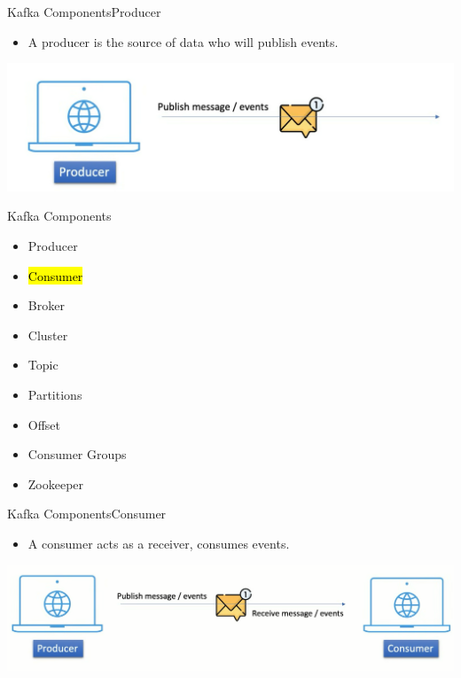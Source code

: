 \documentclass{beamer}
\begin{document}
\begin{frame}{Kafka Components}{Producer}
  \begin{itemize}
    \item A producer is the source of data who will publish events.
  \end{itemize}
  \vspace*{1.5em}
  \includegraphics[scale=0.192]{fig/producer.png}
\end{frame}

\begin{frame}{Kafka Components}
  \begin{itemize}
    \item Producer
    \item \hl{Consumer}
    \item Broker
    \item Cluster
    \item Topic
    \item Partitions
    \item Offset
    \item Consumer Groups
    \item Zookeeper
  \end{itemize}
\end{frame}

\begin{frame}{Kafka Components}{Consumer}
  \begin{itemize}
    \item A consumer acts as a receiver, consumes events.
  \end{itemize}
  \vspace*{1.5em}
  \includegraphics[scale=0.16]{fig/consumer.png}
\end{frame}
\end{document}
